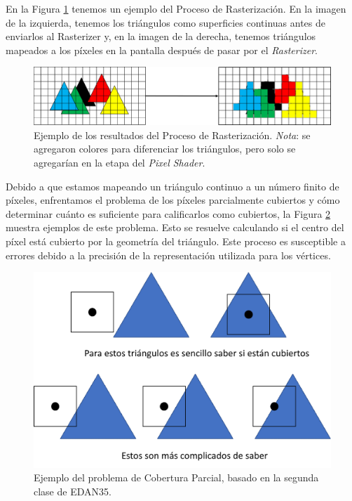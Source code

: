 \documentclass[pregrado]{tesis-usb} %
\begin{document}
En la Figura \ref{fig:rasterizationproc} tenemos un ejemplo del Proceso de Rasterización. En la imagen de la izquierda, tenemos los triángulos como superficies continuas antes de enviarlos al Rasterizer y, en la imagen de la derecha, tenemos triángulos mapeados a los píxeles en la pantalla después de pasar por el \textit{Rasterizer}.

\begin{figure}[!hbt]
	\centering
	\includegraphics[scale=0.75]{images/rasterization_process.png} 
	\caption{Ejemplo de los resultados del Proceso de Rasterización.
		\emph{Nota}: se agregaron colores para diferenciar los triángulos, pero solo se agregarían en la etapa del \textit{Pixel Shader}.
	}\label{fig:rasterizationproc}
\end{figure}

Debido a que estamos mapeando un triángulo continuo a un número finito de píxeles, enfrentamos el problema de los píxeles parcialmente cubiertos y cómo determinar cuánto es suficiente para calificarlos como cubiertos, la Figura \ref{fig:partialcover} muestra ejemplos de este problema. Esto se resuelve calculando si el centro del píxel está cubierto por la geometría del triángulo. Este proceso es susceptible a errores debido a la precisión de la representación utilizada para los vértices.

\begin{figure}[!hbt]
	\centering
	\includegraphics[scale=0.5]{images/edge_testing.png} 
	\caption{Ejemplo del problema de Cobertura Parcial, basado en la segunda clase de EDAN35. ~\cite{Doggett2017EDAN35}}\label{fig:partialcover}
\end{figure}
\end{document}
